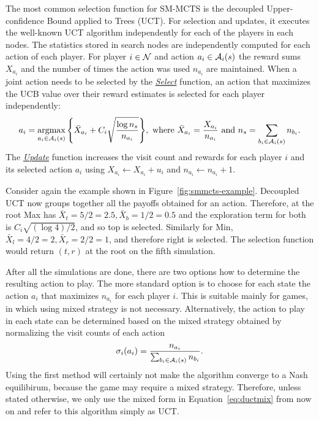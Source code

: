 The most common selection function for SM-MCTS is the decoupled Upper-confidence Bound applied to Trees (UCT).
For selection and updates, it executes the well-known UCT \cite{UCT} algorithm independently for each of the players in each nodes.
The statistics stored in search nodes are independently computed for each action of each player. For player $i\in \mathcal{N}$ and 
action $a_i \in \mathcal{A}_i(s)$ the reward sums $X_{a_i}$ and the number of times the action was used $n_{a_i}$ are maintained.
When a joint action needs to be selected by the \emph{\underline{Select}} function, an action that maximizes the UCB value over 
their reward estimates is selected for each player independently:
\begin{equation}
a_i = \argmax_{a_i \in \cA_i(s)}{ \left\{ \bar{X}_{a_i} + C_i \sqrt{\frac{\log n_s}{n_{a_i}}} \right\} },
  \mbox{ where } \bar{X}_{a_i} = \frac{X_{a_i}}{n_{a_i}} \mbox{ and } n_s=\sum_{b_i \in \cA_i(s)} n_{b_i}.\label{eq:uct}
\end{equation}
\noindent The \emph{\underline{Update}} function increases the visit count and rewards for each player $i$ and its selected action $a_i$ using $X_{a_i} \leftarrow X_{a_i} + u_i$
and $n_{a_i} \leftarrow n_{a_i} + 1$.

Consider again the example shown in Figure~\ref{fig:smmcts-example}. Decoupled UCT now groups together all the payoffs obtained 
for an action. Therefore, at the root Max has $\bar{X}_t = 5/2 = 2.5, \bar{X}_b = 1/2 = 0.5$ and the exploration term for both is 
$C_i \sqrt{(\log 4) / 2}$, and so top is selected. Similarly for Min, $\bar{X}_l = 4/2 = 2, \bar{X}_r = 2/2 = 1$, and
therefore right is selected. The selection function would return $(t,r)$ at the root on the fifth simulation. 

After all the simulations are done, there are two options how to determine the resulting action to play.
The more standard option is to choose for each state the action $a_i$ that maximizes $n_{a_i}$ for each player $i$.
This is suitable mainly for games, in which using mixed strategy is not necessary.
Alternatively, the action to play in each state can be determined based on the mixed strategy obtained by normalizing the visit counts of each action 
\begin{equation}
\sigma_i(a_i) = \frac{n_{a_i}}{\sum_{b_i\in \mathcal{A}_i(s)} n_{b_i}}.
\label{eq:ductmix}
\end{equation}
Using the first method will certainly not make the algorithm converge to a Nash equilibirum, because the game may require a mixed strategy.
Therefore, unless stated otherwise, we only use the mixed form in Equation~\ref{eq:ductmix} from now on and refer to this algorithm simply as UCT.

